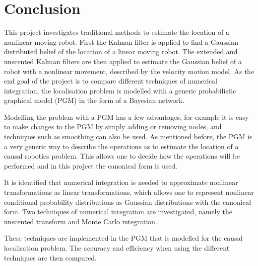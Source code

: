 \documentclass[12pt,oneside,openany,a4paper, %
afrikaans,english,
]{memoir}
\numberwithin{equation}{chapter}
\begin{document}
\chapter{Conclusion}
This project investigates traditional methods to estimate the location of a nonlinear moving robot. First the Kalman filter is applied to find a Gaussian distributed belief of the location of a linear moving robot. The extended and unscented Kalman filters are then applied to estimate the Gaussian belief of a robot with a nonlinear movement, described by the velocity motion model. As the end goal of the project is to compare different techniques of numerical integration, the localisation problem is modelled with a generic probabilistic graphical model (PGM) in the form of a Bayesian network.

Modelling the problem with a PGM has a few advantages, for example it is easy to make changes to the PGM by simply adding or removing nodes, and techniques such as smoothing can also be used. As mentioned before, the PGM is a very generic way to describe the operations as to estimate the location of a causal robotics problem. This allows one to decide how the operations will be performed and in this project the canonical form is used.

It is identified that numerical integration is needed to approximate nonlinear transformations as linear transformations, which allows one to represent nonlinear conditional probability distributions as Gaussian distributions with the canonical form. Two techniques of numerical integration are investigated, namely the unscented transform and Monte Carlo integration.

These techniques are implemented in the PGM that is modelled for the causal localisation problem. The accuracy and efficiency when using the different techniques are then compared. 


\backmatter
{}
\end{document}
